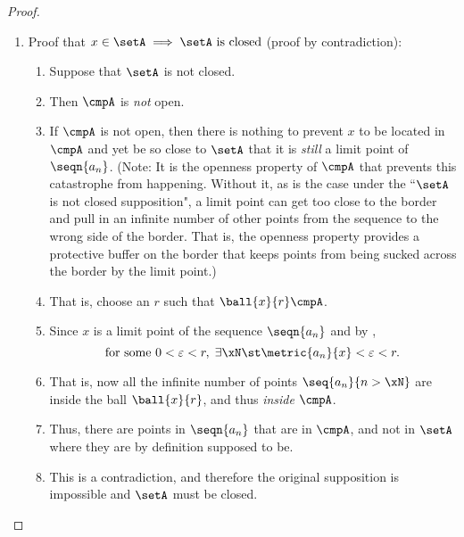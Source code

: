 \begin{proof}
\begin{enumerate}
  \item Proof that $x\in\setA \implies   \setA \text{ is closed}$ (proof by contradiction):
    \begin{enumerate}
      \item Suppose that $\setA$ is not closed.
      \item Then $\cmpA$ is \emph{not} open.
      \item If $\cmpA$ is not open, then there is nothing to prevent
            $x$ to be located in $\cmpA$ and yet be so close to $\setA$ that 
            it is \emph{still} a limit point of $\seqn{a_n}$.
            ({\scriptsize Note: 
            It is the openness property of $\cmpA$ that prevents this
            catastrophe from happening. Without it, as is the case under the 
            ``$\setA$ is not closed supposition", a limit point can get too close
            to the border and pull in an infinite number of other points from the sequence
            to the wrong side of the border. 
            That is, the openness property provides a protective buffer on the border
            that keeps points from being sucked across the border by the limit point.})
      \item That is, choose an $r$ such that $\ball{x}{r}\cmpA$.
      \item Since $x$ is a limit point of the sequence $\seqn{a_n}$ and by 
            , 
            \[ \text{for some } 0<\varepsilon<r,\; \exists\xN \st \metric{a_n}{x}<\varepsilon<r.\]
      \item That is, now all the infinite number of points $\seq{a_n}{n>\xN}$ are inside 
            the ball $\ball{x}{r}$, and thus \emph{inside} $\cmpA$. 
      \item Thus, there are points in $\seqn{a_n}$ that are in $\cmpA$, and 
            not in $\setA$ where they are by definition supposed to be.
      \item This is a contradiction, and therefore the original supposition is 
            impossible and $\setA$ must be closed.
    \end{enumerate}


\end{enumerate}
\end{proof}
